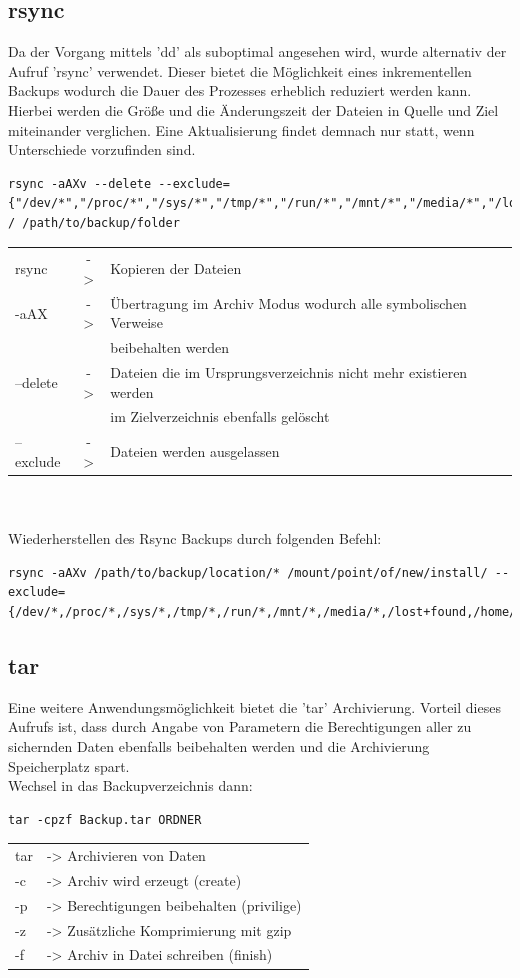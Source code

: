 \subsection{rsync}
Da der Vorgang mittels 'dd' als suboptimal angesehen wird, wurde alternativ der Aufruf 'rsync' verwendet. Dieser bietet die Möglichkeit eines inkrementellen Backups wodurch die Dauer des Prozesses erheblich reduziert werden kann. Hierbei werden die Größe und die Änderungszeit der Dateien in Quelle und Ziel miteinander verglichen. Eine Aktualisierung findet demnach nur statt, wenn Unterschiede vorzufinden sind.
\begin{lstlisting}
rsync -aAXv --delete --exclude={"/dev/*","/proc/*","/sys/*","/tmp/*","/run/*","/mnt/*","/media/*","/lost+found"} / /path/to/backup/folder
\end{lstlisting}
\begin{tabular}{l c l}
rsync	&->& Kopieren der Dateien\\
-aAX	&->& Übertragung im Archiv Modus wodurch alle symbolischen Verweise\\
	&  & beibehalten werden\\
--delete&->& Dateien die im Ursprungsverzeichnis nicht mehr existieren werden\\
	&  & im Zielverzeichnis ebenfalls gelöscht\\
--exclude&->& Dateien werden ausgelassen\\
\end{tabular}\\\\
Wiederherstellen des Rsync Backups durch folgenden Befehl:
\begin{lstlisting}
rsync -aAXv /path/to/backup/location/* /mount/point/of/new/install/ --exclude={/dev/*,/proc/*,/sys/*,/tmp/*,/run/*,/mnt/*,/media/*,/lost+found,/home/*}
\end{lstlisting}

\subsection{tar} %
Eine weitere Anwendungsmöglichkeit bietet die 'tar' Archivierung. Vorteil dieses Aufrufs ist, dass durch Angabe von Parametern die Berechtigungen aller zu sichernden Daten ebenfalls beibehalten werden und die Archivierung Speicherplatz spart.\\
Wechsel in das Backupverzeichnis dann:
\begin{lstlisting}
tar -cpzf Backup.tar ORDNER
\end{lstlisting}
\begin{tabular}{l l}
tar	&-> Archivieren von Daten\\
-c	&-> Archiv wird erzeugt (create)\\
-p	&-> Berechtigungen beibehalten (privilige)\\
-z	&-> Zusätzliche Komprimierung mit gzip\\
-f	&-> Archiv in Datei schreiben (finish)\\
\end{tabular}
\newpage %

